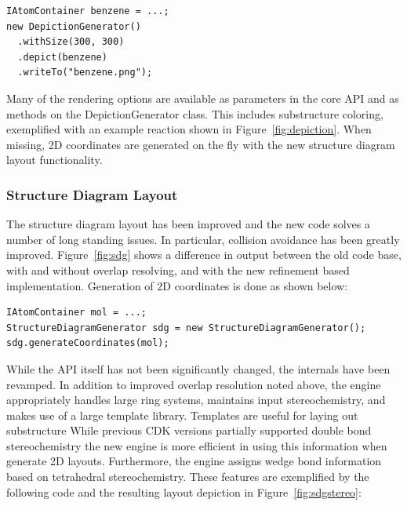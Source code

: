 \documentclass[10pt]{bmcart}
\begin{document}
\vspace{0.2cm}
\begin{verbatim}
IAtomContainer benzene = ...;
new DepictionGenerator()
  .withSize(300, 300)
  .depict(benzene)
  .writeTo("benzene.png");
\end{verbatim}
\vspace{0.2cm}

  Many of the rendering options are available as parameters in the
  core API and as methods on the DepictionGenerator class. This
  includes substructure coloring, exemplified with an example reaction
  shown in Figure~\ref{fig:depiction}.
  When missing, 2D coordinates are generated on the fly with the new structure
  diagram layout functionality.

  \subsubsection*{Structure Diagram Layout}

  The structure diagram layout has been improved and the new code solves a
  number of long standing issues. In particular, collision avoidance has been
  greatly improved. Figure~\ref{fig:sdg} shows a difference in output
  between the old code base, with and without overlap resolving, and with the
  new refinement based implementation\cite{Helson07}. Generation of 2D coordinates is done as shown below:

\vspace{0.2cm}
\begin{verbatim}
IAtomContainer mol = ...;
StructureDiagramGenerator sdg = new StructureDiagramGenerator();
sdg.generateCoordinates(mol);
\end{verbatim}
\vspace{0.2cm}

  While the API itself has not been significantly changed, the
  internals have been revamped. In addition to improved overlap
  resolution noted above, the engine appropriately handles large ring
  systems, maintains input stereochemistry, and makes use of a large
  template library. Templates are useful for laying out substructure
  While previous CDK versions partially supported 
  double bond stereochemistry the new engine is more efficient in
  using this information when generate 2D layouts. Furthermore, the
  engine assigns wedge bond information based on tetrahedral
  stereochemistry. These features are exemplified by the following
  code and the resulting layout depiction in
  Figure~\ref{fig:sdgstereo}:
\end{document}
